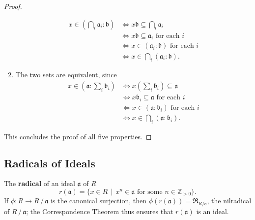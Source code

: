 \documentclass[11pt]{article}
\begin{document}
\begin{adjustwidth}{0.5cm}{}
\begin{proof}
\begin{enumerate}
\begin{align*}
				x \in \left( \bigcap_{i} \mathfrak{a}_{i} : \mathfrak{b} \right) &\iff x \mathfrak{b} \subseteq \bigcap\limits_{i} \mathfrak{a}_{i} \\
				&\iff x \mathfrak{b} \subseteq \mathfrak{a}_{i} \text{ for each } i \\
				&\iff x \in (\mathfrak{a}_{i} : \mathfrak{b}) \text{ for each } i \\
				&\iff x \in \bigcap\limits_{i} (\mathfrak{a}_{i} : \mathfrak{b}).
			\end{align*}
			\item The two sets are equivalent, since
			\begin{align*}
				x \in \left( \mathfrak{a} : \sum\limits_{i} \mathfrak{b}_{i} \right) &\iff x \left( \sum\limits_{i} \mathfrak{b}_{i} \right) \subseteq \mathfrak{a} \\
				&\iff x \mathfrak{b}_{i} \subseteq \mathfrak{a} \text{ for each } i \\
				&\iff x \in (\mathfrak{a} : \mathfrak{b}_{i}) \text{ for each } i \\
				&\iff x \in \bigcap\limits_{i} (\mathfrak{a} : \mathfrak{b}_{i}).
			\end{align*}
		\end{enumerate}
		This concludes the proof of all five properties.
	\end{proof}
\end{adjustwidth}


\subsection{Radicals of Ideals}

The \textbf{radical} of an ideal $\mathfrak{a}$ of $R$
\[
	r(\mathfrak{a}) = \{ x \in R \,\mid\, x^{n} \in \mathfrak{a} \text{ for some } n \in \mathbb{Z}_{> 0} \}.
\]
If $\phi : R \to R \,/\, \mathfrak{a}$ is the canonical surjection, then $\phi(r(\mathfrak{a})) = \mathfrak{R}_{R / \mathfrak{a}}$, the nilradical of $R \,/\, \mathfrak{a}$; the Correspondence Theorem thus ensures that $r(\mathfrak{a})$ is an ideal.
\end{document}
